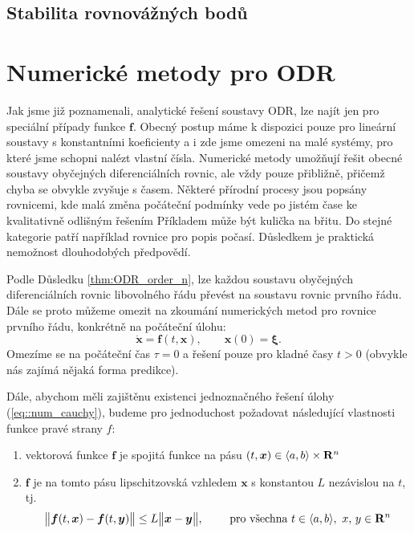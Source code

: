 \documentclass[a4paper, 12pt]{book}
\theoremstyle{definition}
\def\Real{{\rm\bf R}}
\def\vc#1{\mathbf{\boldsymbol{#1}}}     %
\def\norm#1{\bigl\Vert#1\bigr\Vert} %
\begin{document}
\section{Stabilita rovnovážných bodů}
\label{stabilita_ODR}



\chapter{Numerické metody pro ODR}
Jak jsme již poznamenali, analytické řešení soustavy ODR, lze najít jen pro speciální případy funkce $\vc f$. Obecný postup máme k dispozici 
pouze pro lineární soustavy s konstantními koeficienty a i zde jsme omezeni na malé systémy, pro které jsme schopni nalézt vlastní čísla.
Numerické metody umožňují řešit obecné soustavy obyčejných diferenciálních rovnic, ale vždy pouze přibližně, přičemž chyba se obvykle zvyšuje s časem.
Některé přírodní procesy jsou popsány rovnicemi, kde malá změna počáteční podmínky vede po jistém čase ke kvalitativně odlišným řešením
Příkladem může být kulička na břitu. Do stejné kategorie patří například rovnice pro popis počasí. Důsledkem je praktická nemožnost 
dlouhodobých předpovědí.

Podle Důsledku \ref{thm:ODR_order_n}, lze každou soustavu obyčejných diferenciálních rovnic libovolného řádu převést na soustavu rovnic prvního řádu.
Dále se proto můžeme omezit na zkoumání numerických metod pro rovnice prvního řádu, konkrétně na počáteční úlohu:
\begin{equation}
  \label{eq::num_cauchy}
  \dot{\vc x}=\vc f(t,\vc x),\qquad\vc x(0)=\vc \xi.
\end{equation}
Omezíme se na počáteční čas $\tau =0$ a řešení pouze pro kladné časy $t>0$ (obvykle nás zajímá nějaká forma predikce).

Dále, abychom měli zajištěnu existenci jednoznačného řešení úlohy (\ref{eq::num_cauchy}),
budeme pro jednoduchost požadovat následující vlastnosti funkce pravé strany $f$:
\begin{enumerate}
 \item vektorová funkce $\vc f$ je spojitá funkce na pásu $(t,\vc x) \in \langle a,b\rangle\times \Real^n$
 \item $\vc f$ je na tomto pásu lipschitzovská vzhledem $\vc x$ s konstantou $L$ nezávislou na $t$, tj.
 \[
    \norm{\vc f(t, \vc x) - \vc f(t, \vc y)} \le L \norm{\vc x - \vc y}, \qquad \text{ pro všechna } t\in\langle a,b \rangle,\ x,\,y \in \Real^n
 \]
\end{enumerate}
\end{document}

